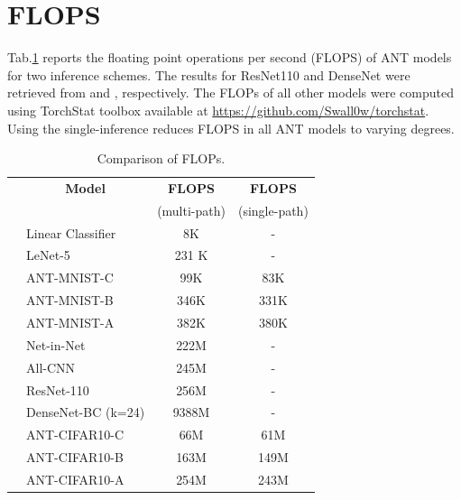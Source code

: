 \section{FLOPS}\label{sec:flops}
\vspace{-2mm}
Tab.\ref{tab:flops} reports the floating point operations per second (FLOPS) of ANT models for two inference schemes. The results for ResNet110 and DenseNet were retrieved from \cite{guan2017energy} and \cite{huang2018condensenet}, respectively. The FLOPs of all other models were computed using TorchStat toolbox available at \url{https://github.com/Swall0w/torchstat}. Using the single-inference reduces FLOPS in all ANT models to varying degrees.

\begin{table}[h]
    \caption{Comparison of FLOPs. \label{tab:flops}}
    \vspace{-5mm}
    \footnotesize
    \center
	\begin{tabular}{|c|l|c|c|}
		\hline
		&\multicolumn{1}{|c}{\textbf{Model}} &  \multicolumn{1}{|c|}{\textbf{FLOPS}} & \multicolumn{1}{c|}{\textbf{FLOPS}}  \\
		& &(multi-path) & (single-path)  \\
		\hline
		\parbox[t]{2mm}{}
		&Linear Classifier & 8K & -   \\
		&LeNet-5 & 231 K & -  \\
		&ANT-MNIST-C & 99K & 83K  \\
	    &ANT-MNIST-B & 346K & 331K \\
        &ANT-MNIST-A & 382K & 380K  \\
        \hline
        
        \parbox[t]{2mm}{}&Net-in-Net & 222M &- \\
        &All-CNN & 245M & -\\
        &ResNet-110 & 256M&- \\
        &DenseNet-BC (k=24)& 9388M &- \\
		&ANT-CIFAR10-C & 66M & 61M  \\
        &ANT-CIFAR10-B & 163M & 149M  \\
        &ANT-CIFAR10-A & 254M & 243M  \\
		\hline
	\end{tabular}
\end{table}


